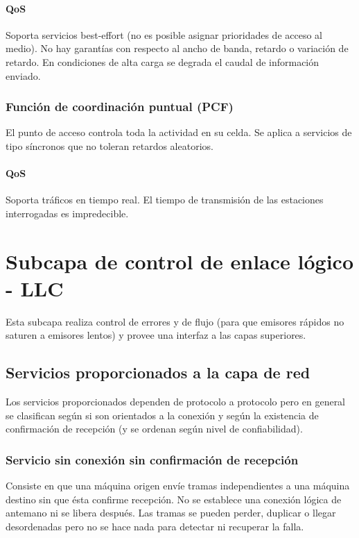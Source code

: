 \documentclass{book}
\begin{document}
	\paragraph{QoS} Soporta servicios best-effort (no es posible asignar prioridades de acceso al medio). No hay garantías con respecto al ancho de banda, retardo o variación de retardo. En condiciones de alta carga se degrada el caudal de información enviado.
	
	\subsubsection{Función de coordinación puntual (PCF)}
	El punto de acceso controla toda la actividad en su celda. Se aplica a servicios de tipo síncronos que no toleran retardos aleatorios.
	
	\paragraph{QoS} Soporta tráficos en tiempo real. El tiempo de transmisión de las estaciones interrogadas es impredecible.
	
	\section{Subcapa de control de enlace lógico - LLC}
	Esta subcapa realiza control de errores y de flujo (para que emisores rápidos no saturen a emisores lentos) y provee una interfaz a las capas superiores.
	
	\subsection{Servicios proporcionados a la capa de red}
	Los servicios proporcionados dependen de protocolo a protocolo pero en general se clasifican según si son orientados a la conexión y según la existencia de confirmación de recepción (y se ordenan según nivel de confiabilidad).
	
	\subsubsection{Servicio sin conexión sin confirmación de recepción}
	Consiste en que una máquina origen envíe tramas independientes a una máquina destino sin que ésta confirme recepción. No se establece una conexión lógica de antemano ni se libera después. Las tramas se pueden perder, duplicar o llegar desordenadas pero no se hace nada para detectar ni recuperar la falla.
	
\end{document}
